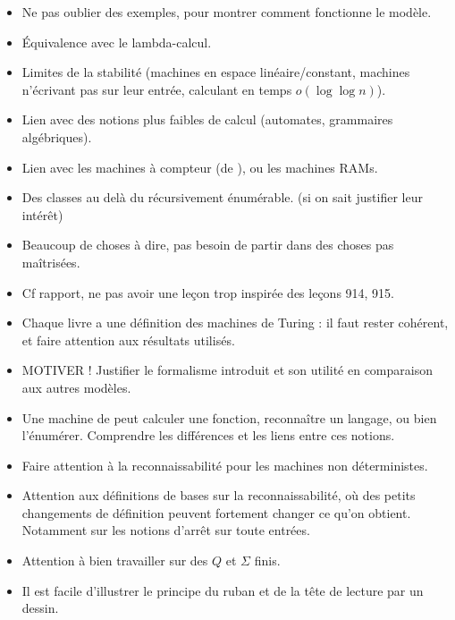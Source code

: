 \documentclass{agregfiche}
\begin{document}
\secidees

\begin{itemize}
    \item Ne pas oublier des exemples, pour montrer comment fonctionne le modèle.
    \item Équivalence avec le lambda-calcul.
	\item Limites de la stabilité (machines en espace linéaire/constant, 
	machines n'écrivant pas sur leur entrée,
	calculant en temps $o(\log \log n)$).
	\item Lien avec des notions plus faibles de calcul (automates, grammaires
	algébriques).
	\item Lien avec les machines à compteur (de ), ou les machines RAMs.
    \item Des classes au delà du récursivement énumérable. (si on sait justifier leur intérêt)  %
\end{itemize}

\secpieges

\begin{itemize}
    \item Beaucoup de choses à dire, pas besoin de partir dans des choses pas maîtrisées.
    \item Cf rapport, ne pas avoir une leçon trop inspirée des leçons 914, 915.
    \item Chaque livre a une définition des machines de Turing : il faut rester cohérent, et faire attention aux résultats utilisés.
    \item MOTIVER ! Justifier le formalisme introduit et son utilité en comparaison
        aux autres modèles. 
    \item Une machine de  peut calculer une fonction, reconnaître un langage, ou bien l'énumérer. Comprendre les différences et les liens entre ces notions.
    \item Faire attention à la reconnaissabilité pour les machines 
        non déterministes.
    \item Attention aux définitions de bases sur la reconnaissabilité, où des petits changements de définition peuvent fortement changer ce qu'on obtient. Notamment sur les notions d'arrêt sur toute entrées.
     \item Attention à bien travailler sur des $Q$ et $\Sigma$
      finis.
      \item Il est facile d'illustrer le principe du ruban et de la tête de lecture par un dessin.
\end{itemize}
\end{document}
